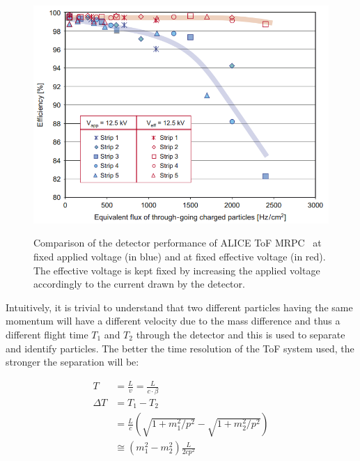 \newpage
	
\begingroup\setlength{\intextsep}{5pt}\setlength{\columnsep}{15pt}
	
	\begin{figure}
		\centering
		\includegraphics[width = \linewidth]{fig/chapt3/ALICE-Rate_Capability.png}\\
		\caption{\label{fig:MRPCRate} Comparison of the detector performance of ALICE ToF MRPC~\cite{ALICI2007} at fixed applied voltage (in blue) and at fixed effective voltage (in red). The effective voltage is kept fixed by increasing the applied voltage accordingly to the current drawn by the detector.}
	\end{figure}
	
	Intuitively, it is trivial to understand that two different particles having the same momentum will have a different velocity due to the mass difference and thus a different flight time $T_1$ and $T_2$ through the detector and this is used to separate and identify particles. The better the time resolution of the ToF system used, the stronger the separation will be:
	
	\begin{equation}
	\label{eq:TOFID}
		\begin{aligned}
			T &= \frac{L}{v} = \frac{L}{c\cdot\beta}\\
			\Delta T &= T_1 - T_2\\
			&= \frac{L}{c}\left(\sqrt{1+m_1^2/p^2} - \sqrt{1+m_2^2/p^2}\right)\\
			&\cong (m_1^2 - m_2^2)\frac{L}{2cp^2}
		\end{aligned}
	\end{equation}
	
